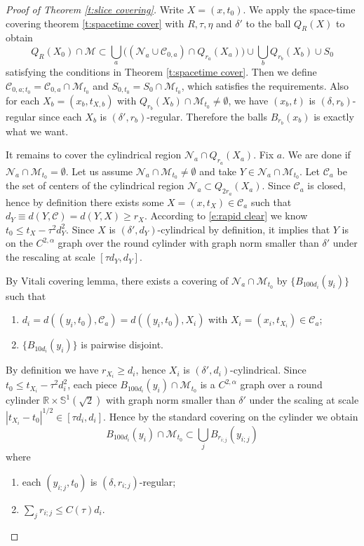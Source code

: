 \documentclass[11pt,reqno]{amsart}
\numberwithin{equation}{section}
\newcommand{\RR}{\mathds{R}}
\newcommand{\cC}{\mathcal{C}}
\newcommand{\cM}{\mathcal{M}}
\newcommand{\cN}{\mathcal{N}}
\theoremstyle{definition}
\theoremstyle{remark}
\theoremstyle{remark}
\theoremstyle{remark}
\theoremstyle{remark}\newtheorem{conjecture}[equation]{Conjecture}
\theoremstyle{remark}\newtheorem{question}[equation]{Question}
\begin{document}
\begin{proof}[Proof of Theorem \ref{t:slice covering}]
    Write $X=(x,t_0)$. We apply the space-time covering theorem \ref{t:spacetime cover} with $R, \tau,\eta$ and $\delta'$ to the ball $Q_R(X)$ to obtain
    \begin{equation*}
        Q_R(X_0) \cap \cM \subset \bigcup_a \big((\cN_a \cup \cC_{0,a})\cap Q_{r_a}(X_a) \big) \cup \bigcup_b Q_{r_b}(X_b) \cup S_0 
    \end{equation*}
satisfying the conditions in Theorem \ref{t:spacetime cover}. Then we define $\cC_{0,a;t_0} = \cC_{0,a} \cap  \cM_{t_0}$ and $S_{0,t_0} = S_0 \cap  \cM_{t_0}$, which satisfies the requirements. Also for each $X_b=(x_b,t_{X,b})$ with $Q_{r_b}(X_b) \cap \cM_{t_0} \neq \emptyset$, we have $(x_b,t)$ is $(\delta,r_b)$-regular since each $X_b$ is $(\delta',r_b)$-regular. Therefore the balls $B_{r_b}(x_b)$ is exactly what we want. 

It remains to cover the cylindrical region $\cN_{a} \cap Q_{r_a}(X_a)$. Fix $a$. We are done if $\cN_a \cap \cM_{t_0} = \emptyset$. Let us assume $\cN_a \cap \cM_{t_0} \neq \emptyset$ and take $Y \in \cN_a \cap \cM_{t_0}$. Let $\cC_a$ be the set of centers of the cylindrical region $\cN_a\subset Q_{2r_a}(X_a)$. Since $\cC_a$ is closed, hence by definition there exists some $X=(x,t_X) \in \cC_a$ such that $d_Y \equiv d(Y,\cC) = d(Y,X) \ge r_X$. According to \eqref{e:rapid clear} we know $t_0 \le t_X - \tau^2 d_Y^2$. Since $X$ is $(\delta',d_Y)$-cylindrical by definition, it implies that $Y$ is on the $C^{2,\alpha}$ graph over the round cylinder with graph norm smaller than $\delta'$ under the rescaling at scale $[\tau d_Y, d_Y]$.


By Vitali covering lemma, there exists a covering of $\cN_a \cap \cM_{t_0}$ by $\{B_{100d_i}(y_i)\}$ such that
\begin{enumerate}
    \item $d_i = d((y_i,t_0), \cC_a) = d((y_i,t_0),X_i)$ with $X_i = (x_i,t_{X_i}) \in \cC_a$;
    \item $\{B_{10d_i}(y_i)\}$ is pairwise disjoint.
\end{enumerate}
By definition we have $r_{X_i} \ge d_i$, hence $X_i$ is $(\delta',d_i)$-cylindrical. Since $t_0 \le t_{X_i} - \tau^2 d_i^2$, each piece $B_{100d_i}(y_i) \cap \cM_{t_0}$ is a $C^{2,\alpha}$ graph over a round cylinder $\RR \times \mathds{S}^1({\sqrt{2}})$ with graph norm smaller than $\delta'$ under the scaling at scale $|t_{X_i}-t_0|^{1/2} \in [\tau d_i, d_i]$. Hence by the standard covering on the cylinder we obtain 
\begin{equation*}
    B_{100 d_i}(y_i)  \cap \cM_{t_0} \subset \bigcup_{j} B_{r_{i;j}}(y_{i;j})
\end{equation*}
where
\begin{enumerate}
    \item each $(y_{i;j},t_0)$ is $(\delta,r_{i;j})$-regular;
    \item $\sum_{j} r_{i;j} \le C(\tau) d_i$.
\end{enumerate}


\end{proof}
\end{document}
